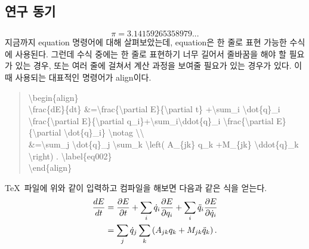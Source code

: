 \documentclass{gshs-report-v1.2}
\begin{document}
\subsection{연구 동기}
\begin{equation}
	\pi=3.14159265358979... \nonumber
\end{equation}
지금까지 equation 명령어에 대해 살펴보았는데, equation은 한 줄로 표현 가능한 수식에 사용된다. 그런데 수식 중에는 한 줄로 표현하기 너무 길어서 줄바꿈을 해야 할 필요가 있는 경우, 또는 여러 줄에 걸쳐서 계산 과정을 보여줄 필요가 있는 경우가 있다. 이 때 사용되는 대표적인 명령어가 align이다.
\begin{quote}
	{\textbackslash}begin\{align\} \\
	{\textbackslash}frac\{dE\}\{dt\} 
	\&={\textbackslash}frac\{{\textbackslash}partial 
	E\}\{{\textbackslash}partial t\} +{\textbackslash}sum\_i 
	{\textbackslash}dot\{q\}\_i 
	{\textbackslash}frac\{{\textbackslash}partial 
	E\}\linebreak\{{\textbackslash}partial 
	q\_i\}+{\textbackslash}sum\_i{\textbackslash}ddot\{q\}\_i 
	{\textbackslash}frac\{{\textbackslash}partial 
	E\}\{{\textbackslash}partial {\textbackslash}dot\{q\}\_i\} 
	{\textbackslash}notag {\textbackslash}{\textbackslash} \\
	\&={\textbackslash}sum\_j {\textbackslash}dot\{q\}\_j 
	{\textbackslash}sum\_k {\textbackslash}left( A\_\{jk\} q\_k +M\_\{jk\} 
	{\textbackslash}ddot\{q\}\_k {\textbackslash}right) . 
	{\textbackslash}label\{eq002\}\\
	{\textbackslash}end\{align\}
\end{quote}
\TeX\ 파일에 위와 같이 입력하고 컴파일을 해보면 다음과 같은 식을 얻는다.
\begin{align}
	\frac{dE}{dt} &=\frac{\partial E}{\partial t} +\sum_i \dot{q}_i \frac{\partial E}{\partial q_i} +\sum_i \ddot{q}_i \frac{\partial E}{\partial\dot{q}_i} \notag\\
	&=\sum_j \dot{q}_j \sum_k \left( A_{jk} q_k +M_{jk} \ddot{q}_k \right). \label{eq002}
\end{align}
\end{document}
